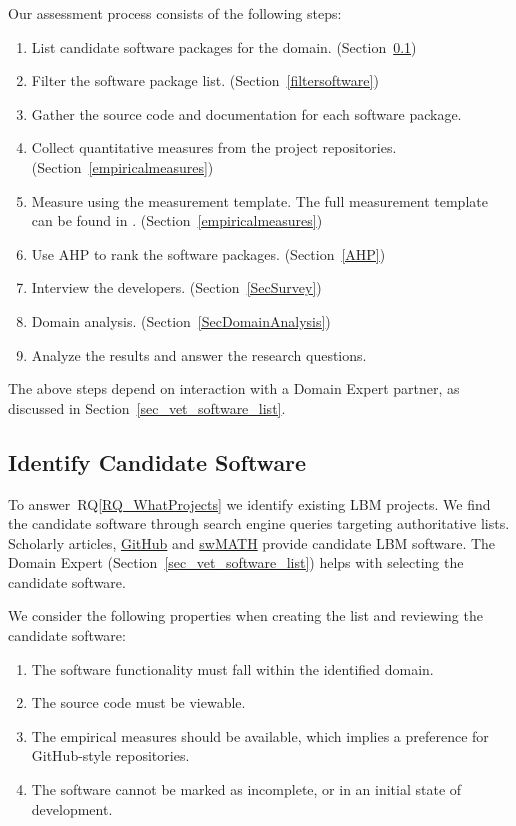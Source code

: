 \documentclass[final, 3p, times, authoryear]{elsarticle}
\newcommand{\rqref}[1]{RQ\ref{#1}}
\begin{document}
Our assessment process consists of the following steps: 

\begin{enumerate}
	\item List candidate software packages for the domain.
	(Section~\ref{identifysoftware})
	\item Filter the software package list. (Section~\ref{filtersoftware})
	\item Gather the source code and documentation for each software package.
	\item Collect quantitative measures from the project repositories.
	(Section~\ref{empiricalmeasures})
	\item Measure using the measurement template.  The full measurement template
	can be found in \citet{SmithEtAl2021}. (Section~\ref{empiricalmeasures})
	\item Use AHP to rank the software packages. (Section~\ref{AHP})
	\item Interview the developers. (Section~\ref{SecSurvey})
	\item Domain analysis. (Section~\ref{SecDomainAnalysis})
	\item Analyze the results and answer the research questions.
\end{enumerate}

\noindent The above steps depend on interaction with a Domain Expert partner, as
discussed in Section~\ref{sec_vet_software_list}.

\subsection{Identify Candidate Software} \label{identifysoftware}

To answer~\rqref{RQ_WhatProjects} we identify existing LBM projects. We find the
candidate software through search engine queries targeting authoritative lists.
Scholarly articles, \href{https://github.com/} {GitHub} and
\href{https://swmath.org/} {swMATH} provide candidate LBM software. The Domain
Expert (Section~\ref{sec_vet_software_list}) helps with selecting the candidate
software. 

We consider the following properties when creating the list and reviewing the
candidate software:

\begin{enumerate}
	\item The software functionality must fall within the identified domain.
	\item The source code must be viewable.
	\item The empirical measures should be available, which implies a preference
	for GitHub-style repositories.
	\item The software cannot be marked as incomplete, or in an initial state of
	development.
\end{enumerate}
\end{document}
